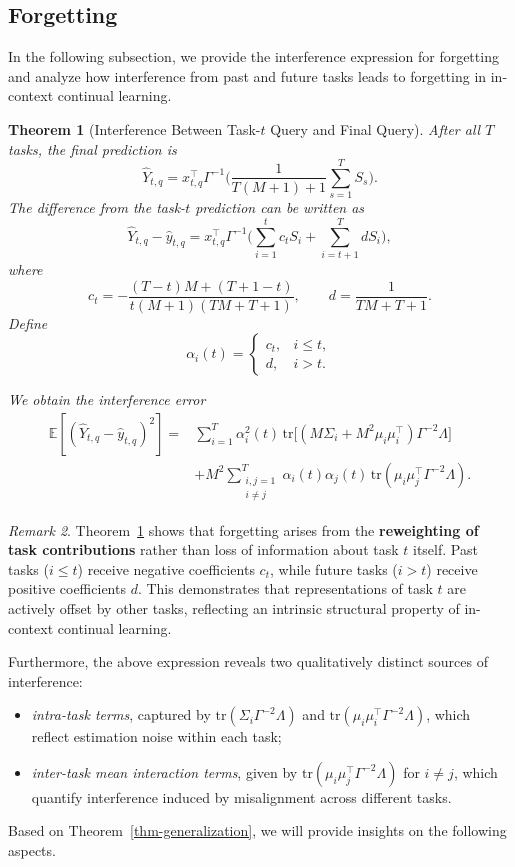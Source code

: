 \documentclass{article}
\theoremstyle{plain}
\newtheorem{theorem}{Theorem}[section]
\theoremstyle{definition}
\theoremstyle{remark}
\newtheorem{remark}[theorem]{Remark}
\begin{document}
\subsection{Forgetting}
\label{sec:forgetting}
In the following subsection, we provide the interference expression for forgetting and analyze how interference from past and future tasks leads to forgetting in in-context continual learning.
\begin{theorem}[Interference Between Task-$t$ Query and Final Query]
\label{forgetting}
After all $T$ tasks, the final prediction is
\[
\hat{Y}_{t,q}
= x_{t,q}^\top\Gamma^{-1}
\Big(
\frac{1}{T(M+1)+1}
\sum_{s=1}^{T} S_s
\Big).
\]
The difference from the task-$t$ prediction can be written as
\[
\hat{Y}_{t,q}-\hat{y}_{t,q}
=
x_{t,q}^\top\Gamma^{-1}
\Big(
\sum_{i=1}^t c_t S_i
+\sum_{i=t+1}^T d S_i
\Big),
\]
where
\[
c_t=-\frac{(T-t)M + (T+1-t)}{t(M+1)(TM+T+1)},
\qquad
d=\frac{1}{TM+T+1}.
\]
Define
\[
\alpha_i(t)=
\begin{cases}
c_t, & i\le t,\\[4pt]
d, & i> t.
\end{cases}
\]

We obtain the interference error
\[
\begin{aligned}
\mathbb{E}[(\hat{Y}_{t,q}-\hat y_{t,q})^2]
=&\sum_{i=1}^T \alpha_i^2(t)\,\mathrm{tr}\!\big[(M\Sigma_i+M^2\mu_i\mu_i^\top)\Gamma^{-2}\Lambda\big]
\\&+M^2\!\sum_{\substack{i,j=1\\i\ne j}}^T\alpha_i(t)\alpha_j(t)\,\mathrm{tr}(\mu_i\mu_j^\top\Gamma^{-2}\Lambda). 
\end{aligned}
\]
\end{theorem}
\begin{remark}
Theorem~\ref{forgetting} shows that forgetting arises from the \textbf{reweighting of task contributions} rather than loss of information about task $t$ itself.
Past tasks ($i\le t$) receive negative coefficients $c_t$, while future tasks ($i>t$) receive positive coefficients $d$.
This demonstrates that representations of task $t$ are actively offset by other tasks, reflecting an intrinsic structural property of in-context continual learning.
\end{remark}

Furthermore, the above expression reveals two qualitatively distinct sources of interference:
\begin{itemize}
\item \emph{intra-task terms}, captured by $\mathrm{tr}(\Sigma_i\Gamma^{-2}\Lambda)$ and $\mathrm{tr}(\mu_i\mu_i^\top\Gamma^{-2}\Lambda)$, which reflect estimation noise within each task;
\item \emph{inter-task mean interaction terms}, given by $\mathrm{tr}(\mu_i \mu_j^\top\Gamma^{-2}\Lambda)$ for $i\neq j$, which quantify interference induced by misalignment across different tasks.
\end{itemize}
Based on Theorem~\ref{thm-generalization}, we will provide insights on the following aspects.
\end{document}
